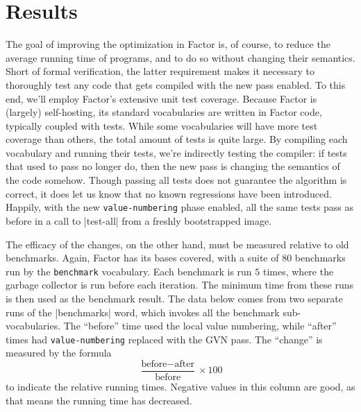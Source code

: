\section{Results}\label{sec:vn:results}

The goal of improving the optimization in Factor is, of course, to reduce the
average running time of programs, and to do so without changing their
semantics.  Short of formal verification, the latter requirement makes it
necessary to thoroughly test any code that gets compiled with the new pass
enabled.  To this end, we'll employ Factor's extensive unit test coverage.
Because Factor is (largely) self-hosting, its standard vocabularies are written
in Factor code, typically coupled with tests.  While some vocabularies will
have more test coverage than others, the total amount of tests is quite large.
By compiling each vocabulary and running their tests, we're indirectly testing
the compiler: if tests that used to pass no longer do, then the new pass is
changing the semantics of the code somehow.  Though passing all tests does not
guarantee the algorithm is correct, it does let us know that no known
regressions have been introduced.  Happily, with the new
\Verb|value-numbering| phase enabled, all the same tests pass as before in a
call to \factor|test-all| from a freshly bootstrapped image.

The efficacy of the changes, on the other hand, must be measured relative to
old benchmarks.  Again, Factor has its bases covered, with a suite of $80$
benchmarks run by the \Verb|benchmark| vocabulary.  Each benchmark is run $5$
times, where the garbage collector is run before each iteration.  The minimum
time from these runs is then used as the benchmark result.  The data below
comes from two separate runs of the \factor|benchmarks| word, which invokes all
the benchmark sub-vocabularies.  The ``before'' time used the local value
numbering, while ``after'' times had \Verb|value-numbering| replaced with the
\gls{GVN} pass.  The ``change'' is measured by the formula
%
$$\frac{\text{before} - \text{after}}{\text{before}} \times 100$$
%
to indicate the relative running times.  Negative values in this column are
good, as that means the running time has decreased.


